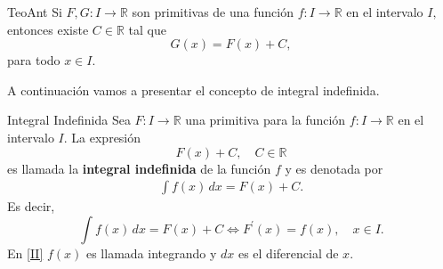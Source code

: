 
\begin{proposicion}{}{TeoAnt}\label{teo-antiderivada-G}
Si $F, G:I \to \mathbb R$ son primitivas de una funci\'on $f:I \to \mathbb R$ en el intervalo $I,$ entonces existe  $C\in\mathbb R$ tal que
$$G(x)=F(x)+C,$$ para todo $x\in I.$
\end{proposicion}
\vspace*{0.5cm}

A continuaci\'on vamos a presentar el concepto de integral indefinida. \\
 
\begin{definicion}{}{Integral Indefinida}
 Sea $F:I \to \mathbb R$ una primitiva para la funci\'on $f:I \to \mathbb R$ en el intervalo $I.$ La expresi\'on $$ F(x)+C, \quad C\in\mathbb R$$ es llamada la \textbf{integral indefinida} de la funci\'on $f$ y es denotada por 
\begin{align}\label{II}
\displaystyle\int f(x)\,dx=F(x)+C.
\end{align}
Es decir, $$\displaystyle\int f(x)\,dx=F(x)+C \Longleftrightarrow F^{\prime}(x)=f(x), \quad x\in I.$$
En \eqref{II} $f(x)$ es llamada integrando y $dx$ es el diferencial de $x$. 
\end{definicion}
\vspace*{0.5cm}

